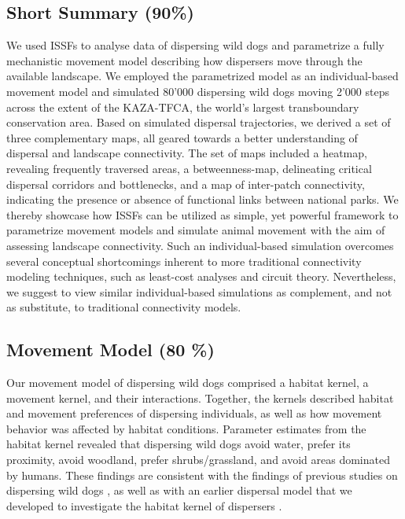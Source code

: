 \documentclass[abstract=on,10pt,a4paper,bibliography=totocnumbered]{article}
\begin{document}
\subsection{Short Summary (90\%)}
We used ISSFs to analyse data of dispersing wild dogs and parametrize a fully
mechanistic movement model describing how dispersers move through the available
landscape. We employed the parametrized model as an individual-based movement
model and simulated 80'000 dispersing wild dogs moving 2'000 steps across the
extent of the KAZA-TFCA, the world's largest transboundary conservation area.
Based on simulated dispersal trajectories, we derived a set of three
complementary maps, all geared towards a better understanding of dispersal and
landscape connectivity. The set of maps included a heatmap, revealing frequently
traversed areas, a betweenness-map, delineating critical dispersal corridors and
bottlenecks, and a map of inter-patch connectivity, indicating the presence or
absence of functional links between national parks. We thereby showcase how
ISSFs can be utilized as simple, yet powerful framework to parametrize movement
models and simulate animal movement with the aim of assessing landscape
connectivity. Such an individual-based simulation overcomes several conceptual
shortcomings inherent to more traditional connectivity modeling techniques, such
as least-cost analyses and circuit theory. Nevertheless, we suggest to view
similar individual-based simulations as complement, and not as substitute, to
traditional connectivity models.

\subsection{Movement Model (80 \%)}
Our movement model of dispersing wild dogs comprised a habitat kernel, a
movement kernel, and their interactions. Together, the kernels described habitat
and movement preferences of dispersing individuals, as well as how movement
behavior was affected by habitat conditions. Parameter estimates from the
habitat kernel revealed that dispersing wild dogs avoid water, prefer its
proximity, avoid woodland, prefer shrubs/grassland, and avoid areas dominated by
humans. These findings are consistent with the findings of previous studies on
dispersing wild dogs \citep{DaviesMostert.2012, Masenga.2016, Woodroffe.2019,
Oneill.2020}, as well as with an earlier dispersal model that we developed
to investigate the habitat kernel of dispersers \citep{Hofmann.2021}.
\end{document}
